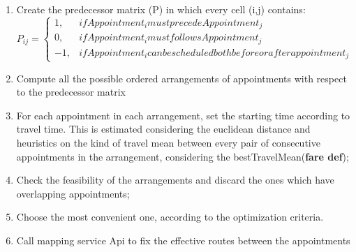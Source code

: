 \begin{enumerate}
\item Create the predecessor matrix (P) in which every cell (i,j) contains:
\begin{equation}
    P_{ij}=
    \begin{cases}
      1, & if Appointment_i must precede Appointment_j \\
      0, & if Appointment_i must follows Appointment_j \\
      -1, & if Appointment_i can be scheduled both before or after appointment_j
    \end{cases}
  \end{equation}
\item Compute all the possible ordered arrangements of appointments with respect to the predecessor matrix
\item For each appointment in each arrangement, set the starting time according to travel time. This is estimated considering the euclidean distance and heuristics on the kind of travel mean between every pair of consecutive appointments in the arrangement, considering the bestTravelMean(\textbf{fare def});
\item Check the feasibility of the arrangements and discard the ones which have overlapping appointments;
\item Choose the most convenient one, according to the optimization criteria.
\item Call mapping service Api to fix the effective routes between the appointments
\end{enumerate}

